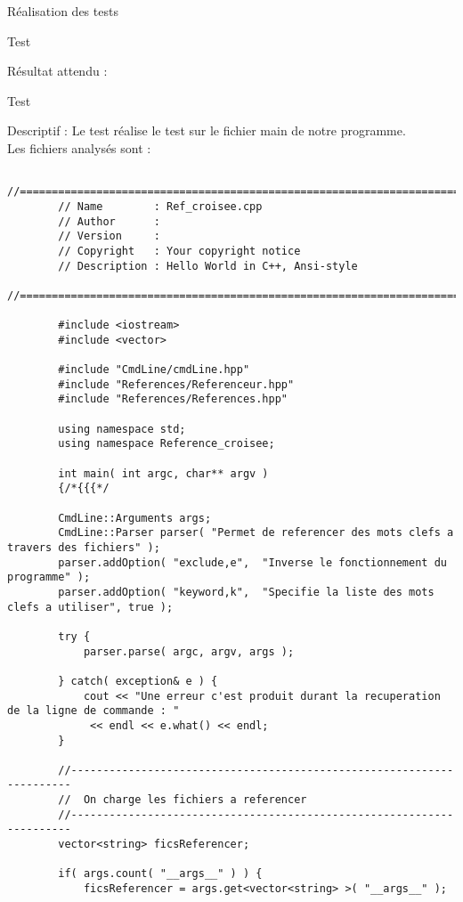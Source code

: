 \documentclass{article}
\begin{document}
\begin{section}{Réalisation des tests}
\begin{subsection}{Test }
\begin{paragraph}{Résultat attendu :}
\begin{listing}[h!]
      \end{listing}
    \end{paragraph}

  \end{subsection}

   \newpage 
  
  \begin{subsection}{Test }
    
    \begin{paragraph}{Descriptif :}
	Le test  réalise le test sur le fichier main de notre programme.\\ Les fichiers analysés sont : 
      
      \begin{verbatim}
	    //============================================================================
	    // Name        : Ref_croisee.cpp
	    // Author      :
	    // Version     :
	    // Copyright   : Your copyright notice
	    // Description : Hello World in C++, Ansi-style
	    //============================================================================

	    #include <iostream>
	    #include <vector>

	    #include "CmdLine/cmdLine.hpp"
	    #include "References/Referenceur.hpp"
	    #include "References/References.hpp"

	    using namespace std;
	    using namespace Reference_croisee;

	    int main( int argc, char** argv )
	    {/*{{{*/

		CmdLine::Arguments args;
		CmdLine::Parser parser( "Permet de referencer des mots clefs a travers des fichiers" );
		parser.addOption( "exclude,e",  "Inverse le fonctionnement du programme" );
		parser.addOption( "keyword,k",  "Specifie la liste des mots clefs a utiliser", true );

		try {
		    parser.parse( argc, argv, args );

		} catch( exception& e ) {
		    cout << "Une erreur c'est produit durant la recuperation de la ligne de commande : "
			 << endl << e.what() << endl;
		}

		//----------------------------------------------------------------------
		//  On charge les fichiers a referencer
		//----------------------------------------------------------------------
		vector<string> ficsReferencer;

		if( args.count( "__args__" ) ) {
		    ficsReferencer = args.get<vector<string> >( "__args__" );


\end{verbatim}
\end{paragraph}
\end{subsection}
\end{section}
\end{document}
